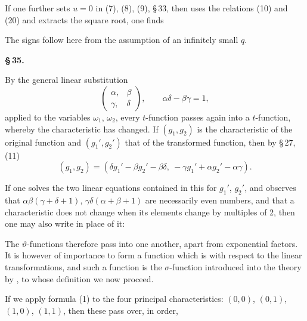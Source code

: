 If one further sets $u = 0$ in (7), (8), (9), \S\,33, then uses the relations (10) and (20) and extracts the square root, one finds


The signs follow here from the assumption of an infinitely small $q$.

\begin{center}
\textbf{\S\,35. }
\end{center}

By the general linear substitution
\[
\begin{pmatrix} \alpha, & \beta \\ \gamma, & \delta \end{pmatrix}, \qquad \alpha\delta - \beta\gamma = 1,
\]
applied to the variables $\omega_1$, $\omega_2$, every $t$-function passes again into a $t$-function, whereby the characteristic has changed. If $(g_1, g_2)$ is the characteristic of the original function and $(g_1', g_2')$ that of the transformed function, then by \S\,27, (11)
\[
(g_1, g_2) = (\delta g_1' - \beta g_2' - \beta\delta,\ -\gamma g_1' + \alpha g_2' - \alpha\gamma).
\]

If one solves the two linear equations contained in this for $g_1'$, $g_2'$, and observes that $\alpha\beta(\gamma+\delta+1)$, $\gamma\delta(\alpha+\beta+1)$ are necessarily even numbers, and that a characteristic does not change when its elements change by multiples of 2, then one may also write in place of it:


The $\vartheta$-functions therefore pass into one another, apart from exponential factors. It is however of importance to form a function which is  with respect to the linear transformations, and such a function is the $\sigma$-function introduced into the theory by , to whose definition we now proceed.

If we apply formula (1) to the four principal characteristics: $(0, 0)$, $(0, 1)$, $(1, 0)$, $(1, 1)$, then these pass over, in order,
